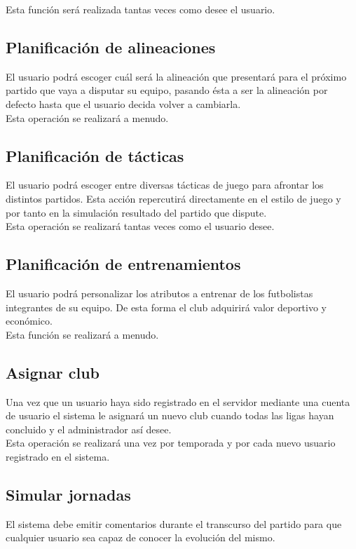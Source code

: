 Esta función será realizada tantas veces como desee el usuario.

\subsection{Planificación de alineaciones}
El usuario podrá escoger cuál será la alineación que presentará para el próximo
partido que vaya a disputar su equipo, pasando ésta a ser la alineación por
defecto hasta que el usuario decida volver a
cambiarla.\\

Esta operación se realizará a menudo.
\subsection{Planificación de tácticas}
El usuario podrá escoger entre diversas tácticas de juego para afrontar los
distintos partidos. Esta acción repercutirá directamente en el estilo de juego y
por tanto en la simulación resultado del
partido que dispute.\\

Esta operación se realizará tantas veces como el usuario desee.
\subsection{Planificación de entrenamientos}
El usuario podrá personalizar los atributos a entrenar de los futbolistas
integrantes de su equipo. De esta forma el club adquirirá
valor deportivo y económico.\\

Esta función se realizará a menudo.

\subsection{Asignar club}
Una vez que un usuario haya sido registrado en el servidor mediante una cuenta
de usuario el sistema le asignará un nuevo club cuando
todas las ligas hayan concluido y el administrador así desee.\\

Esta operación se realizará una vez por temporada y por cada nuevo usuario
registrado en el sistema.

\subsection{Simular jornadas}
El sistema debe emitir comentarios durante el transcurso del partido para que
cualquier usuario sea capaz de conocer la evolución del mismo.\\

